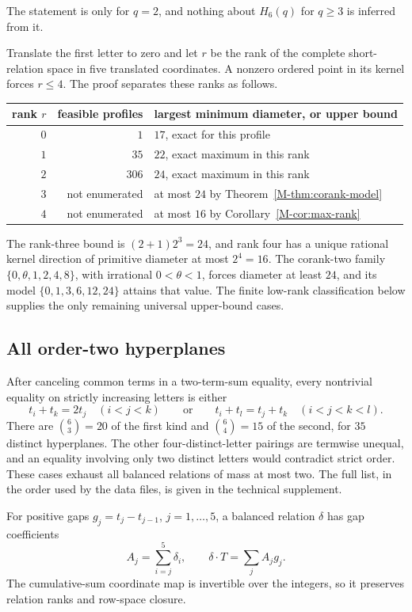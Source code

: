 \documentclass[11pt,reqno]{amsart}
\theoremstyle{plain}
\theoremstyle{definition}
\theoremstyle{plain}
\theoremstyle{plain}
\theoremstyle{plain}
\theoremstyle{plain}
\theoremstyle{plain}
\theoremstyle{plain}
\theoremstyle{definition}
\theoremstyle{definition}
\theoremstyle{definition}
\theoremstyle{plain}
\begin{document}
The statement is only for $q=2$, and nothing about
$H_6(q)$ for $q\ge3$ is inferred from it.

Translate the first letter to zero and let $r$ be the rank of the complete
short-relation space in five translated coordinates. A nonzero ordered point
in its kernel forces $r\le4$. The proof separates these ranks as follows.
\begin{center}
\begin{tabular}{@{}rrl@{}}
\toprule
rank $r$ & feasible profiles & largest minimum diameter, or upper bound\\
\midrule
$0$ & $1$ & $17$, exact for this profile\\
$1$ & $35$ & $22$, exact maximum in this rank\\
$2$ & $306$ & $24$, exact maximum in this rank\\
$3$ & not enumerated & at most $24$ by Theorem~\ref{M-thm:corank-model}\\
$4$ & not enumerated & at most $16$ by Corollary~\ref{M-cor:max-rank}\\
\bottomrule
\end{tabular}
\end{center}
The rank-three bound is $(2+1)2^3=24$, and rank four has a unique rational
kernel direction of primitive diameter at most $2^4=16$. The corank-two
family $\{0,\theta,1,2,4,8\}$, with
irrational $0<\theta<1$, forces diameter at least $24$, and its model
$\{0,1,3,6,12,24\}$ attains that value. The finite low-rank classification
below supplies the only remaining universal upper-bound cases.

\subsection{All order-two hyperplanes}
After canceling common terms in a two-term-sum equality, every nontrivial
equality on strictly increasing letters is either
\[
 t_i+t_k=2t_j\quad(i<j<k)\qquad\text{or}\qquad
 t_i+t_l=t_j+t_k\quad(i<j<k<l).
\]
There are $\binom63=20$ of the first kind and $\binom64=15$ of the second,
for $35$ distinct hyperplanes. The other four-distinct-letter pairings are
termwise unequal, and an equality involving only two distinct letters would
contradict strict order. These cases exhaust all balanced relations of mass
at most two. The full list, in the order used by the data files, is given in
the technical supplement.

For positive gaps $g_j=t_j-t_{j-1}$, $j=1,\ldots,5$, a balanced relation
$\delta$ has gap coefficients
\[
 A_j=\sum_{i=j}^5\delta_i,\qquad \delta\cdot T=\sum_jA_jg_j .
\]
The cumulative-sum coordinate map is invertible over the integers, so it
preserves relation ranks and row-space closure.
\end{document}

